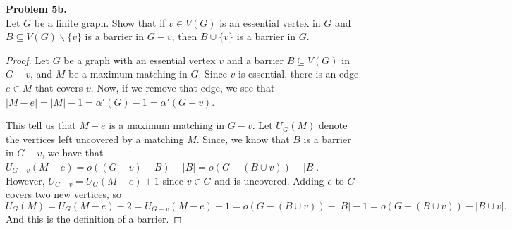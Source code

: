 \documentclass{article}
\newcommand{\size}[1]{|#1|}
\newcommand{\set}[1]{\{#1\}}
\newenvironment{hwproof}[2]
{
    \textbf{Problem #1.}\\
    #2
    \begin{proof}
}{
    \end{proof}
}
\begin{document}
\begin{hwproof}
    {5b}
    {Let $G$ be a finite graph. Show that if $v \in V(G)$ is an essential vertex in $G$ and $B \subseteq V(G) \backslash \set{v}$ is a barrier in $G - v$, then
        $B \cup \set{v}$ is a barrier in $G$.}

    Let $G$ be a graph with an essential vertex $v$ and a barrier $B \subseteq V(G)$ in $G-v$, and $M$ be a maximum matching in $G$. Since $v$ is essential, there is an
    edge $e \in M$ that covers $v$. Now, if we remove that edge, we see that $\size{M-e} = \size{M} - 1 = \alpha'(G) - 1 = \alpha'(G - v)$.

    This tell us that $M-e$ is a maximum matching in $G - v$. Let $U_G(M)$ denote the vertices left uncovered by a matching $M$. Since, we know that $B$ is a barrier in
    $G - v$, we have that $U_{G-v}(M-e) = o((G-v) - B) - \size{B} = o(G - (B\cup v)) - \size{B}$. However, $U_{G-v} = U_G(M-e) + 1$ since $v \in G$ and is uncovered.
    Adding $e$ to $G$ covers two new vertices, so
    \begin{equation}
        U_G(M) = U_G(M-e) - 2 = U_{G-v}(M-e) - 1 = o(G - (B\cup v)) - \size{B} - 1 = o(G - (B \cup v)) - \size{B\cup v}.
    \end{equation}
    And this is the definition of a barrier.
\end{hwproof}
\end{document}
